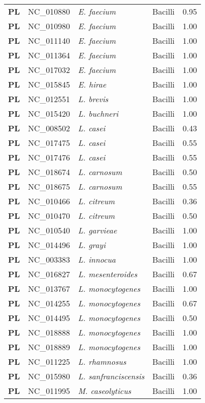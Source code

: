 \begin{adjustwidth}{-3cm}{2cm}
{\begin{supertabular}{>{\bfseries}l|p{0.1\textwidth}p{0.14\textwidth}l|l}
PL & NC\_010880 & \textit{E. faecium} & Bacilli & 0.95\\
PL & NC\_010980 & \textit{E. faecium} & Bacilli & 1.00\\
PL & NC\_011140 & \textit{E. faecium} & Bacilli & 1.00\\
PL & NC\_011364 & \textit{E. faecium} & Bacilli & 1.00\\
PL & NC\_017032 & \textit{E. faecium} & Bacilli & 1.00\\
PL & NC\_015845 & \textit{E. hirae} & Bacilli & 1.00\\
PL & NC\_012551 & \textit{L. brevis} & Bacilli & 1.00\\
PL & NC\_015420 & \textit{L. buchneri} & Bacilli & 1.00\\
PL & NC\_008502 & \textit{L. casei} & Bacilli & 0.43\\
PL & NC\_017475 & \textit{L. casei} & Bacilli & 0.55\\
PL & NC\_017476 & \textit{L. casei} & Bacilli & 0.55\\
PL & NC\_018674 & \textit{L. carnosum} & Bacilli & 0.50\\
PL & NC\_018675 & \textit{L. carnosum} & Bacilli & 0.55\\
PL & NC\_010466 & \textit{L. citreum} & Bacilli & 0.36\\
PL & NC\_010470 & \textit{L. citreum} & Bacilli & 0.50\\
PL & NC\_010540 & \textit{L. garvieae} & Bacilli & 1.00\\
PL & NC\_014496 & \textit{L. grayi} & Bacilli & 1.00\\
PL & NC\_003383 & \textit{L. innocua} & Bacilli & 1.00\\
PL & NC\_016827 & \textit{L. mesenteroides} & Bacilli & 0.67\\
PL & NC\_013767 & \textit{L. monocytogenes} & Bacilli & 1.00\\
PL & NC\_014255 & \textit{L. monocytogenes} & Bacilli & 0.67\\
PL & NC\_014495 & \textit{L. monocytogenes} & Bacilli & 0.50\\
PL & NC\_018888 & \textit{L. monocytogenes} & Bacilli & 1.00\\
PL & NC\_018889 & \textit{L. monocytogenes} & Bacilli & 1.00\\
PL & NC\_011225 & \textit{L. rhamnosus} & Bacilli & 1.00\\
PL & NC\_015980 & \textit{L. sanfranciscensis} & Bacilli & 0.36\\
PL & NC\_011995 & \textit{M. caseolyticus} & Bacilli & 1.00\\

\end{supertabular}}
\end{adjustwidth}
